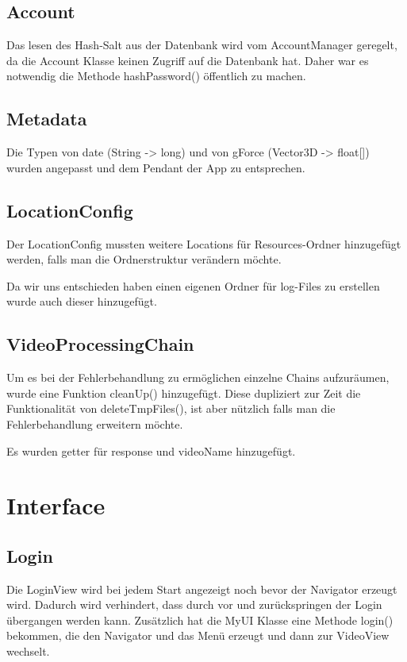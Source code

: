 \subsection{Account}
Das lesen des Hash-Salt aus der Datenbank wird vom AccountManager geregelt, da die Account Klasse keinen Zugriff auf die Datenbank hat. Daher war es notwendig die Methode hashPassword() öffentlich zu machen.

\subsection{Metadata}
Die Typen von date (String -> long) und von gForce (Vector3D -> float[]) wurden angepasst und dem Pendant der App zu entsprechen.

\subsection{LocationConfig}
Der LocationConfig mussten weitere Locations für Resources-Ordner hinzugefügt werden, falls man die Ordnerstruktur verändern möchte. \par
Da wir uns entschieden haben einen eigenen Ordner für log-Files zu erstellen wurde auch dieser hinzugefügt.

\subsection{VideoProcessingChain}
Um es bei der Fehlerbehandlung zu ermöglichen einzelne Chains aufzuräumen, wurde eine Funktion cleanUp() hinzugefügt. Diese dupliziert zur Zeit die Funktionalität von deleteTmpFiles(), ist aber nützlich falls man die Fehlerbehandlung erweitern möchte. \par 
Es wurden getter für response und videoName hinzugefügt.

\section{Interface}

\subsection{Login}
Die LoginView wird bei jedem Start angezeigt noch bevor der Navigator erzeugt wird. Dadurch wird verhindert, dass durch vor und zurückspringen der Login übergangen werden kann. Zusätzlich hat die MyUI Klasse eine Methode login() bekommen, die den Navigator und das Menü erzeugt und dann zur VideoView wechselt.

